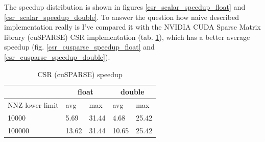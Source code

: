 \documentclass{article}
\begin{document}
The speedup distribution is shown in figures \ref{csr_scalar_speedup_float} and \ref{csr_scalar_speedup_double}. To answer the question
how naive described implementation really is I've compared it with the NVIDIA CUDA Sparse Matrix library (cuSPARSE) CSR implementation
(tab. \ref{csr_cusparse_speedup_table}), which has a better average speedup (fig. \ref{csr_cusparse_speedup_float} and \ref{csr_cusparse_speedup_double}). 

\begin{table}[H]
	\centering
	\begin{tabular}{ |p{2.6cm}||p{1cm}|p{1cm}|p{1cm}|p{1cm}|  }
	 \hline
		& \multicolumn{2}{|c|}{float} & \multicolumn{2}{|c|}{double}\\
	 \hline
	 NNZ lower limit & avg & max & avg & max  \\
	 \hline
	 10000  & 5.69  & 31.44 & 4.68 & 25.42 \\
	 100000 & 13.62 & 31.44 & 10.65 & 25.42 \\
	 \hline
	\end{tabular}
	\caption{CSR (cuSPARSE) speedup}
  \label{csr_cusparse_speedup_table}
\end{table}

\begin{figure}[H]
\centering
{}
\qquad %
\end{figure}
\end{document}
